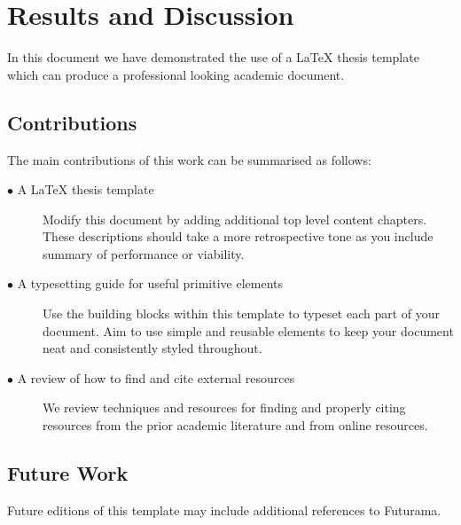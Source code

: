 \chapter{Results and Discussion}
\label{chap:results}

In this document we have demonstrated the use of a \LaTeX{} thesis template which can produce a professional looking academic document. 


\section{Contributions} 
\label{sec:conclusion_contributions}

The main contributions of this work can be summarised as follows:
\begin{description}	

	\item[\(\bullet\) A \LaTeX{} thesis template]\hfill

Modify this document by adding additional top level content chapters.
These descriptions should take a more retrospective tone as you include summary of performance or viability. 

	\item[\(\bullet\) A typesetting guide for useful primitive elements]\hfill

Use the building blocks within this template to typeset each part of your document.
Aim to use simple and reusable elements to keep your document neat and consistently styled throughout.

	\item[\(\bullet\) A review of how to find and cite external resources]\hfill

We review techniques and resources for finding and properly citing resources from the prior academic literature and from online resources. 

\end{description}


\section{Future Work}
\label{sec:conclusion_future_work}

Future editions of this template may include additional references to Futurama.

